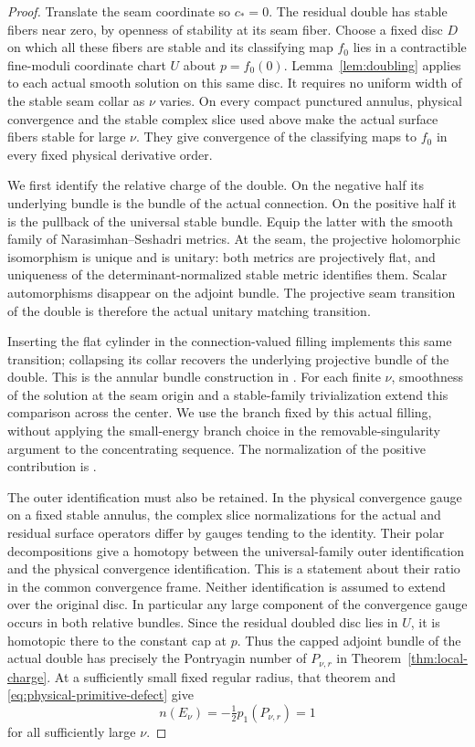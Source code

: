 \documentclass[11pt]{amsart}
\theoremstyle{definition}
\theoremstyle{remark}
\theoremstyle{plain}
\begin{document}
\begin{proof}
Translate the seam coordinate so $c_*=0$. The residual double
has stable fibers near zero, by openness of stability at its
seam fiber. Choose a fixed disc $D$ on which all these fibers
are stable and its classifying map $f_0$ lies in a contractible
fine-moduli coordinate chart $U$ about $p=f_0(0)$.
Lemma~\ref{lem:doubling} applies to each actual smooth solution
on this same disc. It requires no uniform width of the stable
seam collar as $\nu$ varies. On every compact punctured
annulus, physical convergence and the stable complex slice
used above make the actual surface fibers stable for large
$\nu$. They give convergence of the classifying maps to $f_0$
in every fixed physical derivative order.

We first identify the relative charge of the double.
On the negative half its underlying bundle is the bundle of
the actual connection. On the positive half it is the
pullback of the universal stable bundle. Equip the latter
with the smooth family of Narasimhan--Seshadri metrics.
At the seam, the projective holomorphic isomorphism is
unique and is unitary: both metrics are projectively flat,
and uniqueness of the determinant-normalized stable metric
identifies them. Scalar automorphisms disappear on the
adjoint bundle. The projective seam transition of the
double is therefore the actual unitary matching transition.

Inserting the flat cylinder in the connection-valued
filling implements this same transition; collapsing its
collar recovers the underlying projective bundle of the
double. This is the annular bundle construction in
\cite[Lemma~4.67, equations~(4.68)--(4.69)]{DaeFukLip21b}.
For each finite $\nu$, smoothness of the solution at the
seam origin and a stable-family trivialization extend this
comparison across the center. We use the branch fixed by
this actual filling, without applying the small-energy
branch choice in the removable-singularity argument to
the concentrating sequence. The normalization of the
positive contribution is
\cite[Lemma~5.10]{DaeFukLip21a}.

The outer identification must also be retained. In the
physical convergence gauge on a fixed stable annulus,
the complex slice normalizations for the actual and
residual surface operators differ by gauges tending
to the identity. Their polar decompositions give a
homotopy between the universal-family outer identification
and the physical convergence identification. This is a
statement about their ratio in the common convergence
frame. Neither identification is assumed to extend over
the original disc. In particular any large component of
the convergence gauge occurs in both relative bundles.
Since the residual doubled disc lies in $U$, it is
homotopic there to the constant cap at $p$. Thus the
capped adjoint bundle of the actual double has precisely
the Pontryagin number of $P_{\nu,r}$ in
Theorem~\ref{thm:local-charge}. At a sufficiently small
fixed regular radius, that theorem and
\eqref{eq:physical-primitive-defect} give
\begin{equation}\label{eq:automatic-framed-charge}
                   n(E_\nu)=-\tfrac12p_1(P_{\nu,r})=1
\end{equation}
for all sufficiently large $\nu$.


\end{proof}
\end{document}
